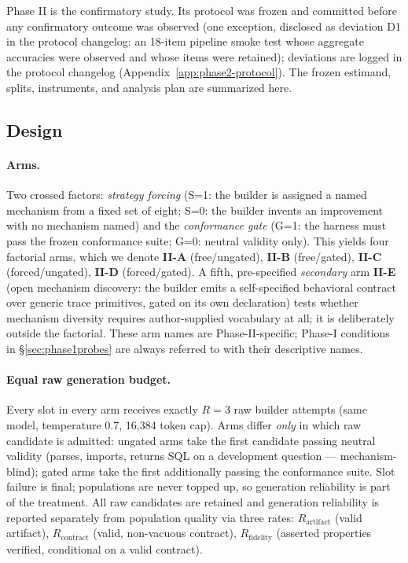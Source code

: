 Phase II is the confirmatory study. Its protocol was frozen and committed
before any confirmatory outcome was observed (one exception, disclosed as
deviation D1 in the protocol changelog: an 18-item pipeline smoke test whose
aggregate accuracies were observed and whose items were retained); deviations are logged in the
protocol changelog (Appendix~\ref{app:phase2-protocol}). The frozen
estimand, splits, instruments, and analysis plan are summarized here.

\subsection{Design}\label{sec:p2design}

\paragraph{Arms.} Two crossed factors: \emph{strategy forcing} (S=1: the
builder is assigned a named mechanism from a fixed set of eight; S=0: the
builder invents an improvement with no mechanism named) and the
\emph{conformance gate} (G=1: the harness must pass the frozen conformance
suite; G=0: neutral validity only). This yields four factorial arms, which
we denote \textbf{II-A} (free/ungated), \textbf{II-B} (free/gated),
\textbf{II-C} (forced/ungated), \textbf{II-D} (forced/gated). A fifth,
pre-specified \emph{secondary} arm \textbf{II-E} (open mechanism discovery:
the builder emits a self-specified behavioral contract over generic trace
primitives, gated on its own declaration) tests whether mechanism diversity
requires author-supplied vocabulary at all; it is deliberately outside the
factorial. These arm names are Phase-II-specific; Phase-I conditions in
\S\ref{sec:phase1probes} are always referred to with their descriptive
names.

\paragraph{Equal raw generation budget.} Every slot in every arm receives
exactly $R{=}3$ raw builder attempts (same model, temperature 0.7, 16{,}384
token cap). Arms differ \emph{only} in which raw candidate is admitted:
ungated arms take the first candidate passing neutral validity (parses,
imports, returns SQL on a development question --- mechanism-blind); gated
arms take the first additionally passing the conformance suite. Slot failure
is final; populations are never topped up, so generation reliability is part
of the treatment. All raw candidates are retained and generation
reliability is reported separately from population quality via three rates:
$R_{\mathrm{artifact}}$ (valid artifact), $R_{\mathrm{contract}}$ (valid,
non-vacuous contract), $R_{\mathrm{fidelity}}$ (asserted properties
verified, conditional on a valid contract).

